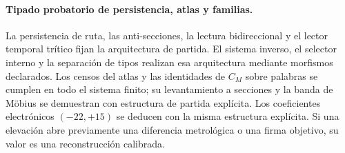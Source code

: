 \paragraph{Tipado probatorio de persistencia, atlas y familias.}
La persistencia de ruta, las anti-secciones, la lectura bidireccional y el
lector temporal tr\'itico fijan la arquitectura de partida. El sistema
inverso, el selector interno y la separaci\'on de tipos realizan esa
arquitectura mediante morfismos declarados. Los censos del atlas y las
identidades de \(C_M\) sobre palabras se cumplen en todo el sistema finito;
su levantamiento a secciones y la banda de M\"obius se demuestran con
estructura de partida expl\'icita. Los coeficientes electr\'onicos
\((-22,+15)\) se deducen con la misma estructura expl\'icita. Si una
elevaci\'on abre previamente una diferencia metrol\'ogica o una firma objetivo,
su valor es una reconstrucci\'on calibrada.
